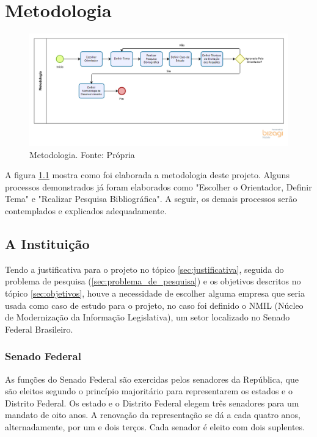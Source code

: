 \chapter[Metodologia]{Metodologia}
\label{cp:metodologia}

\begin{figure}[H]
	\centering
	\includegraphics[width=1.0\textwidth]{figuras/metodologia.png}
	\caption{Metodologia. Fonte: Própria}
	\label{img:metodologia}
\end{figure}

A figura \ref{img:metodologia} mostra como foi elaborada a metodologia deste projeto. Alguns processos demonstrados já foram elaborados como "Escolher o Orientador, Definir Tema" e "Realizar Pesquisa Bibliográfica". A seguir, os demais processos serão contemplados e explicados adequadamente.

\section{A Instituição}
\label{sec:caso_de_estudo}

Tendo a justificativa para o projeto no tópico \ref{sec:justificativa}, seguida do problema de pesquisa (\ref{sec:problema_de_pesquisa}) e os objetivos descritos no tópico \ref{sec:objetivos}, houve a necessidade de escolher alguma empresa que seria usada como caso de estudo para o projeto, no caso foi definido o NMIL (Núcleo de Modernização da Informação Legislativa), um setor localizado no Senado Federal Brasileiro.

\subsection{Senado Federal}

As funções do Senado Federal são exercidas pelos senadores da República, que são eleitos segundo o princípio majoritário para representarem os estados e o Distrito Federal. Os estado e o Distrito Federal elegem três senadores para um mandato de oito anos. A renovação da representação se dá a cada quatro anos, alternadamente, por um e dois terços. Cada senador é eleito com dois suplentes.

